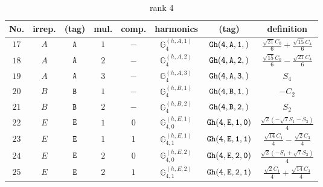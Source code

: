 \documentclass[fleqn,8pt]{jsarticle}
\begin{document}
\begin{table}[ht!]
\begin{center}
\caption{rank 4}
\renewcommand{\arraystretch}{1.3}
\begin{tabular}{cccccccc} \hline \hline
No. & irrep. & (tag) & mul. & comp. & harmonics & (tag) & definition \\ \hline
$ 17 $ & $ A $ & $ {\tt A} $ & $ 1 $ & $ - $ & $ \mathbb{G}_{4}^{(h,A,1)} $ & $ {\tt Gh(4,A,1,)} $ & $ \frac{\sqrt{21} C_{0}}{6} + \frac{\sqrt{15} C_{4}}{6} $ \\
$ 18 $ & $ A $ & $ {\tt A} $ & $ 2 $ & $ - $ & $ \mathbb{G}_{4}^{(h,A,2)} $ & $ {\tt Gh(4,A,2,)} $ & $ \frac{\sqrt{15} C_{0}}{6} - \frac{\sqrt{21} C_{4}}{6} $ \\
$ 19 $ & $ A $ & $ {\tt A} $ & $ 3 $ & $ - $ & $ \mathbb{G}_{4}^{(h,A,3)} $ & $ {\tt Gh(4,A,3,)} $ & $ S_{4} $ \\
$ 20 $ & $ B $ & $ {\tt B} $ & $ 1 $ & $ - $ & $ \mathbb{G}_{4}^{(h,B,1)} $ & $ {\tt Gh(4,B,1,)} $ & $ - C_{2} $ \\
$ 21 $ & $ B $ & $ {\tt B} $ & $ 2 $ & $ - $ & $ \mathbb{G}_{4}^{(h,B,2)} $ & $ {\tt Gh(4,B,2,)} $ & $ S_{2} $ \\
$ 22 $ & $ E $ & $ {\tt E} $ & $ 1 $ & $ 0 $ & $ \mathbb{G}_{4,0}^{(h,E,1)} $ & $ {\tt Gh(4,E,1,0)} $ & $ \frac{\sqrt{2} \left(- \sqrt{7} S_{1} - S_{3}\right)}{4} $ \\
$ 23 $ & $ E $ & $ {\tt E} $ & $ 1 $ & $ 1 $ & $ \mathbb{G}_{4,1}^{(h,E,1)} $ & $ {\tt Gh(4,E,1,1)} $ & $ \frac{\sqrt{14} C_{1}}{4} - \frac{\sqrt{2} C_{3}}{4} $ \\
$ 24 $ & $ E $ & $ {\tt E} $ & $ 2 $ & $ 0 $ & $ \mathbb{G}_{4,0}^{(h,E,2)} $ & $ {\tt Gh(4,E,2,0)} $ & $ \frac{\sqrt{2} \left(- S_{1} + \sqrt{7} S_{3}\right)}{4} $ \\
$ 25 $ & $ E $ & $ {\tt E} $ & $ 2 $ & $ 1 $ & $ \mathbb{G}_{4,1}^{(h,E,2)} $ & $ {\tt Gh(4,E,2,1)} $ & $ \frac{\sqrt{2} C_{1}}{4} + \frac{\sqrt{14} C_{3}}{4} $ \\
 \hline \hline
\end{tabular}
\end{center}
\end{table}
\end{document}
